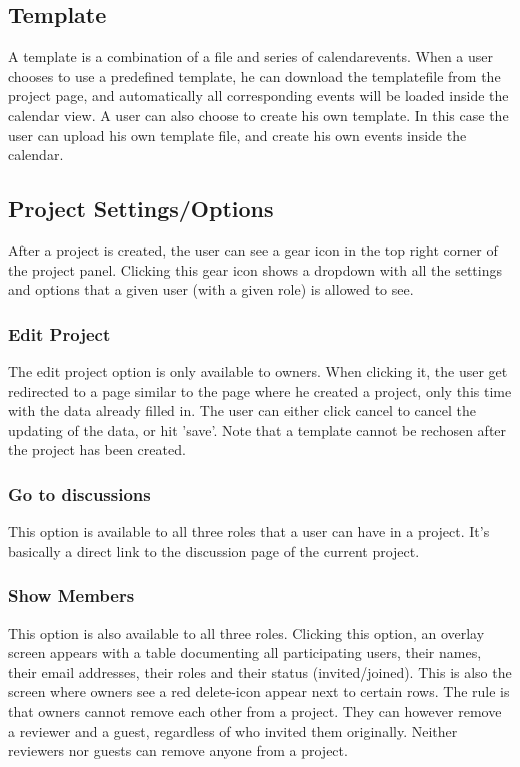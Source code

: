 \subsection{Template}

A template is a combination of a file and series of calendarevents. When a user chooses to use a predefined template, he can download the templatefile
from the project page, and automatically all corresponding events will be loaded inside the calendar view. A user can also choose to create his own template. In this case the user can upload his own template file, and create his own events inside the calendar.

\subsection{Project Settings/Options}

After a project is created, the user can see a gear icon in the top right corner of the project panel. Clicking this gear icon shows a dropdown
with all the settings and options that a given user (with a given role) is allowed to see.

\subsubsection{Edit Project}

The edit project option is only available to owners. When clicking it, the user get redirected to a page similar to the page where he created a project,
only this time with the data already filled in. The user can either click cancel to cancel the updating of the data, or hit 'save'. Note
that a template cannot be rechosen after the project has been created.

\subsubsection{Go to discussions}

This option is available to all three roles that a user can have in a project. It's basically a direct link to the discussion page of the current
project.

\subsubsection{Show Members}

This option is also available to all three roles. Clicking this option, an overlay screen appears with a table documenting all participating
users, their names, their email addresses, their roles and their status (invited/joined). This is also the screen where owners see a red
delete-icon appear next to certain rows. The rule is that owners cannot remove each other from a project. They can however remove a reviewer 
and a guest, regardless of who invited them originally. Neither reviewers nor guests can remove anyone from a project.

